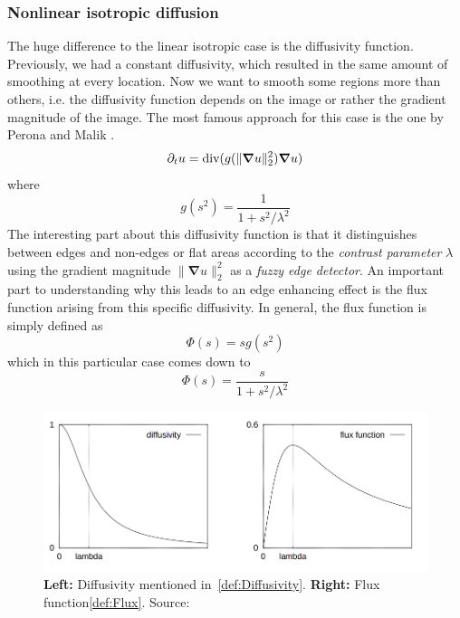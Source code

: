 \subsubsection*{Nonlinear isotropic diffusion}
The huge difference to the linear isotropic case is the diffusivity function.
Previously, we had a constant diffusivity, which resulted in the same amount of smoothing at every location.
Now we want to smooth some regions more than others, i.e. the diffusivity function depends on the
image or rather the gradient magnitude of the image. The most famous approach for this case is the
one by Perona and Malik \cite{perona-malik}.
\begin{equation}
    \partial_t u = \textnormal{div}(g(\lVert\boldsymbol\nabla u\rVert_2^2)\boldsymbol\nabla u)
\end{equation}
where
\begin{equation}
    g(s^2) = \frac{1}{1 + s^2/\lambda^2}\label{def:Diffusivity}
\end{equation}
The interesting part about this diffusivity function is that it distinguishes between edges and
non-edges or flat areas according to the \textit{contrast parameter} $\lambda$ using the gradient
magnitude $\lVert\boldsymbol\nabla u\rVert_2^2$ as a \textit{fuzzy edge detector}\cite{dic18-04}. An important part
to understanding why this leads to an edge enhancing effect is the flux function
arising from this specific diffusivity. In general, the flux function is simply defined as 
\begin{equation}
    \Phi(s) = sg(s^2)
\end{equation}
which in this particular case comes down to
\begin{equation}
    \Phi(s) =\frac{s}{1 + s^2/\lambda^2}\label{def:Flux}
\end{equation}
\begin{figure}
    \includegraphics[width=\linewidth]{../Images/diffflux.png}
    \caption{\textbf{Left:} Diffusivity mentioned in~\eqref{def:Diffusivity}. \textbf{Right:} Flux
    function\eqref{def:Flux}. Source: \cite{dic18-04}}\label{fig:DiffFlux}
\end{figure}
